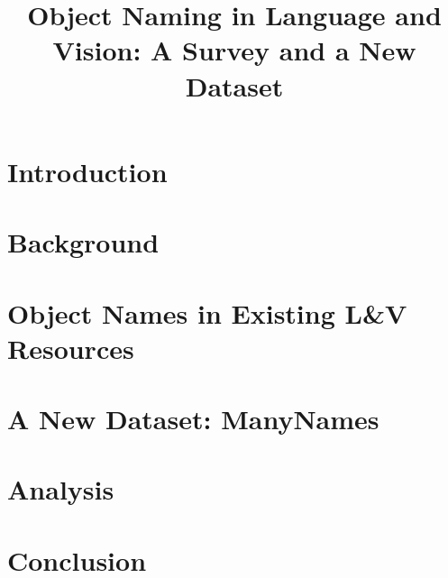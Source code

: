 \documentclass[10pt, a4paper]{article}
\title{Object Naming in Language and Vision: A Survey and a New Dataset}
\begin{document}
\maketitleabstract


\section{Introduction}


\section{Background}
\label{sec:rel-work}


\section{Object Names in Existing L\&V Resources}
\label{sec:survey}


\section{A New Dataset: ManyNames}
\label{sec:data}

	
\section{Analysis}
\label{sec:analysis}


\section{Conclusion}
\label{sec:conc}

\end{document}
